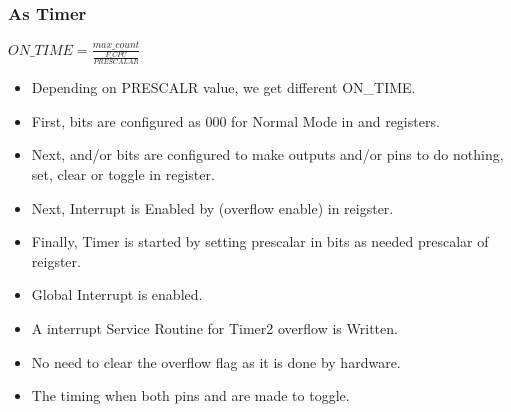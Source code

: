 \documentclass{article}
\begin{document}
\subsubsection{As Timer}
\begin{center}
    $ON\_TIME = \frac{max\_count}{\frac{F\_CPU}{PRESCALAR}}$
\end{center}
\begin{itemize}
    \item Depending on PRESCALR value, we get different ON\_TIME.
    \item First,  bits are configured as 000 for Normal Mode in  and  registers.
    \item Next,  and/or  bits are configured to make outputs  and/or  pins to do nothing, set, clear or toggle in  register.
    \item Next, Interrupt is Enabled by  (overflow enable) in  reigster.
    \item Finally, Timer is started by setting prescalar in  bits as needed prescalar of  reigster.
    \item Global Interrupt is enabled.
    \item A interrupt Service Routine for Timer2 overflow is Written.
    \item No need to clear the overflow flag as it is done by hardware.
    \item The timing when both pins  and  are made to toggle.
\end{itemize}
\end{document}
